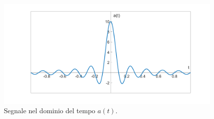 \documentclass[a4paper]{article}
\begin{document}
	\begin{figure}[!htp]
		\centering
		\includegraphics[width=\textwidth]{img/segnale_a-tempo.PNG}
		\caption*{Segnale nel dominio del tempo $a\left(t\right)$.}
	\end{figure}\newpage
	
\end{document}
